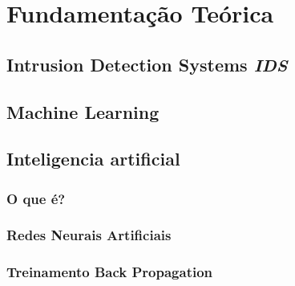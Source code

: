 \chapter[Fundamentação Teórica]{Fundamentação Teórica}

\section{Intrusion Detection Systems \textit{IDS}}
    
\section{Machine Learning}
    

\section{Inteligencia artificial}
    \subsection{O que é?}
        
    \subsection{Redes Neurais Artificiais}
        
    \subsection{Treinamento Back Propagation}
        